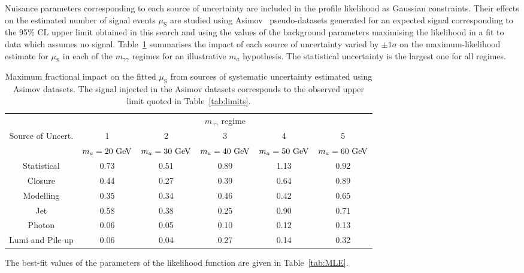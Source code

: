 Nuisance parameters corresponding to each source of uncertainty are included in the profile likelihood as Gaussian constraints.
Their effects on the estimated number of signal events $\mu_\text{S}$ are studied using Asimov~\cite{Cowan:2010js} pseudo-datasets generated
for an expected signal corresponding to the 95\% CL upper limit obtained in this search and using the values of the background 
parameters maximising the likelihood in a fit to data which assumes no signal.
Table~\ref{tab:systs} summarises the impact of each source of uncertainty varied by $\pm1\sigma$ on the maximum-likelihood estimate for $\mu_\text{S}$ in each 
of the $m_{\gamma\gamma}$ regimes for an illustrative $m_a$ hypothesis. The statistical uncertainty is the largest one for all regimes.
\begin{table}[t]
  \begin{center}
    \caption{
      Maximum fractional impact on the fitted $\mu_\text{S}$ from sources of systematic uncertainty estimated using Asimov datasets.
      The signal injected in the Asimov datasets corresponds to the observed upper limit quoted in Table~\ref{tab:limits}.
    }
    \label{tab:systs}
          {\footnotesize
	  \begin{tabular}{cccccc}
	  \hline
          &\multicolumn{5}{c}{$m_{\gamma\gamma}$ regime} \\
          Source of Uncert.   &    1  &   2  &   3  &   4  &   5  \\
            &   $m_a=20~\mathrm{GeV}{}$ &  $m_a=30~\mathrm{GeV}{}$ &  $m_a=40~\mathrm{GeV}{}$ &  $m_a=50~\mathrm{GeV}{}$ &  $m_a=60~\mathrm{GeV}{}$ \\
          \hline
	  Statistical          &     0.73 &     0.51 &     0.89 &     1.13 &     0.92 \\
	  Closure              &     0.44 &     0.27 &     0.39 &     0.64 &     0.89 \\
	  \hline
	  Modelling            &     0.35 &     0.34 &     0.46 &     0.42 &     0.65 \\
	  Jet                  &     0.58 &     0.38 &     0.25 &     0.90 &     0.71 \\
	  Photon               &     0.06 &     0.05 &     0.10 &     0.12 &     0.13 \\
	  Lumi and Pile-up     &     0.06 &     0.04 &     0.27 &     0.14 &     0.32 \\
	  \hline
	  \end{tabular}
          }
  \end{center}
\end{table}
The best-fit values of the parameters of the likelihood function are given in Table~\ref{tab:MLE}.
